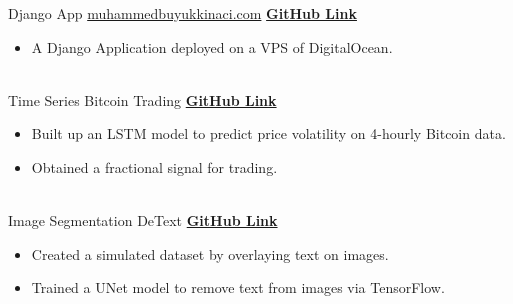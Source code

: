 \documentclass[letterpaper]{DS_class_file} %
\begin{document}
	\begin{twenty} %
		
		\twentyitem
		{Django}
		{App}
		{\hspace{0.3cm}\href{https://muhammedbuyukkinaci.com}{muhammedbuyukkinaci.com}}
		{\href{https://github.com/MuhammedBuyukkinaci/muhammedbuyukkinaci.com}{\textbf{GitHub Link}}}
		{}
		{
			{\begin{itemize}
					\item A Django Application deployed on a VPS of DigitalOcean.
			\end{itemize}}
		}
		\\
		
		\twentyitem
		{Time}
		{Series}
		{\hspace{0.3cm}Bitcoin Trading}
		{\href{https://github.com/MuhammedBuyukkinaci/Bitcoin-Trading}{\textbf{GitHub Link}}}
		{}
		{
			{\begin{itemize}
					\item Built up an LSTM model to predict price volatility on 4-hourly Bitcoin data.
					\item Obtained a fractional signal for trading.
			\end{itemize}}
		}
		\\
		
		\twentyitem
		{Image}
		{Segmentation}
		{\hspace{0.3cm}DeText}
		{\href{https://github.com/MuhammedBuyukkinaci/DeText}{\textbf{GitHub Link}}}
		{}
		{
			{\begin{itemize}
					\item Created a simulated dataset by overlaying text on images.
					\item Trained a UNet model to remove text from images via TensorFlow.
			\end{itemize}}
		}
		\\
		

\end{twenty}
\end{document}
